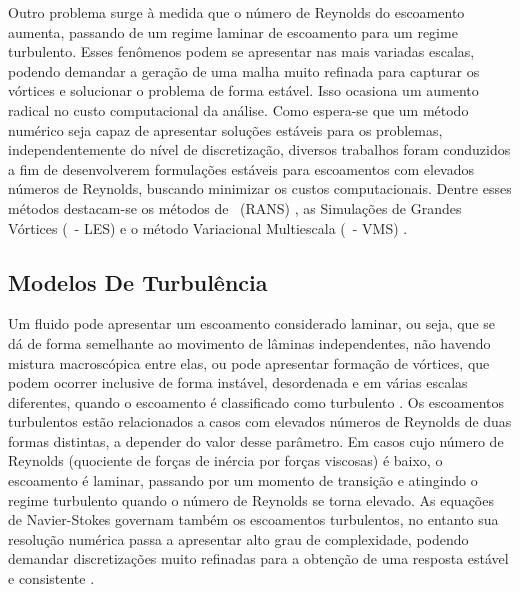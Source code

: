 Outro problema surge à medida que o número de Reynolds do escoamento aumenta, passando de um regime laminar de escoamento para um regime turbulento. Esses fenômenos podem se apresentar nas mais variadas escalas, podendo demandar a geração de uma malha muito refinada para capturar os vórtices e solucionar o problema de forma estável. Isso ocasiona um aumento radical no custo computacional da análise. Como espera-se que um método numérico seja capaz de apresentar soluções estáveis para os problemas, independentemente do nível de discretização, diversos trabalhos foram conduzidos a fim de desenvolverem formulações estáveis para escoamentos com elevados números de Reynolds, buscando minimizar os custos computacionais. Dentre esses métodos destacam-se os métodos de \RANS\ (RANS) \cite{speziale1991analytical,alfonsi2009reynolds,ling2015evaluation}, as Simulações de Grandes Vórtices (\LES\ - LES) \cite{germano1991dynamic,piomelli1999large,hughes2000large,vsekutkovski2021partitioned} e o método Variacional Multiescala (\VMS\ - VMS) \cite{hughes1995multiscale,hughes1998variational,hughes2002variational,bazilevs2010large,bazilevs2013computational}.

\subsection{Modelos De Turbulência} \label{MT}

Um fluido pode apresentar um escoamento considerado laminar, ou seja, que se dá de forma semelhante ao movimento de lâminas independentes, não havendo mistura macroscópica entre elas, ou pode apresentar formação de vórtices, que podem ocorrer inclusive de forma instável, desordenada e em várias escalas diferentes, quando o escoamento é classificado como turbulento \cite{popiolek2005analise,shaughnessy2005introduction}. Os escoamentos turbulentos estão relacionados a casos com elevados números de Reynolds de duas formas distintas, a depender do valor desse parâmetro. Em casos cujo número de Reynolds (quociente de forças de inércia por forças viscosas) é baixo, o escoamento é laminar, passando por um momento de transição e atingindo o regime turbulento quando o número de Reynolds se torna elevado. As equações de Navier-Stokes governam também os escoamentos turbulentos, no entanto sua resolução numérica passa a apresentar alto grau de complexidade, podendo demandar discretizações muito refinadas para a obtenção de uma resposta estável e consistente \cite{neto2002fundamentos}.

